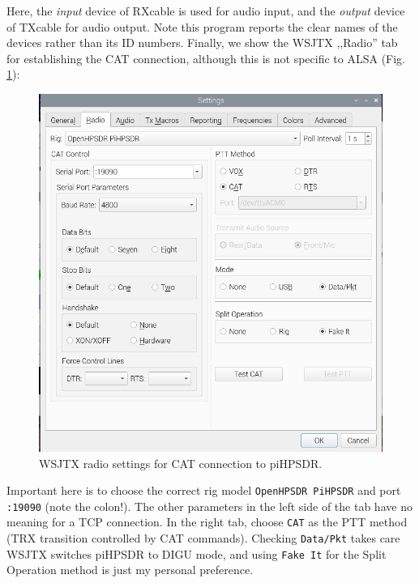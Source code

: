 \documentclass[12pt]{book}
\def\rett#1{\texttt{\color{red}#1}}
\def\pH{pi\-HPSDR\xspace}
\begin{document}
Here, the \textit{input} device of RXcable is used for audio input, and the
\textit{output} device of TXcable for audio output. Note this program reports the
clear names of the devices rather than its ID numbers. Finally, we show the WSJTX ,,Radio''
tab for establishing the CAT connection, although this is not specific to ALSA
(Fig. \ref{fig:wsjtx_settings_radio}):

\begin{figure}[ht]
\center
\includegraphics[width=12cm]{wsjtx_settings_radio.png}
\caption{WSJTX radio settings for CAT connection to \pH.}
\label{fig:wsjtx_settings_radio}
\end{figure}

Important here is to choose the correct rig model \rett{OpenHPSDR PiHPSDR} and
port \rett{:19090} (note the colon!). The other parameters in the left side of the tab
have no meaning for a TCP connection. In the right tab, choose \rett{CAT} as
the PTT method (TRX transition controlled by CAT commands). Checking \rett{Data/Pkt}
takes care WSJTX switches \pH to DIGU mode, and using \rett{Fake It} for the Split
Operation method is just my personal preference.
\end{document}
